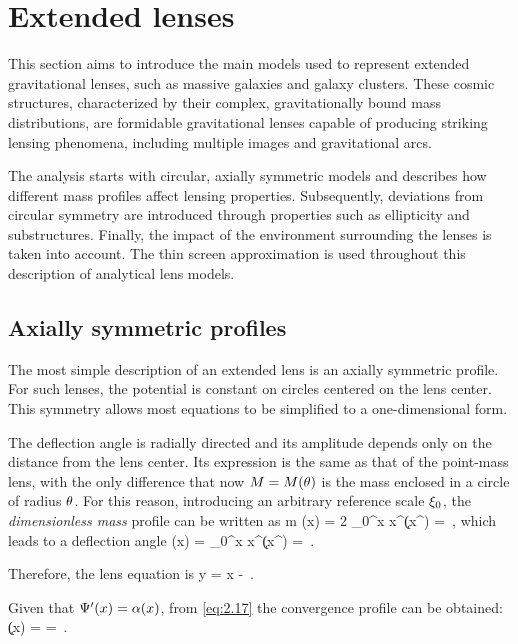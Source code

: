 \section{Extended lenses}
\label{sec:ext_lenses}
This section aims to introduce the main models used to represent extended gravitational lenses, such as massive galaxies and galaxy clusters. These cosmic structures, characterized by their complex, gravitationally bound mass distributions, are formidable gravitational lenses capable of producing striking lensing phenomena, including multiple images and gravitational arcs.

The analysis starts with circular, axially symmetric models and describes how different mass profiles affect lensing properties. Subsequently, deviations from circular symmetry are introduced through properties such as ellipticity and substructures. Finally, the impact of the environment surrounding the lenses is taken into account. The thin screen approximation is used throughout this description of analytical lens models.


\subsection{Axially symmetric profiles}
\label{subsec:axially_profiles}
The most simple description of an extended lens is an axially symmetric profile. For such lenses, the potential is constant on circles centered on the lens center. This symmetry allows most equations to be simplified to a one-dimensional form.

The deflection angle is radially directed and its amplitude depends only on the distance from the lens center. Its expression is the same as that of the point-mass lens, with the only difference that now $M = M(\theta)$ is the mass enclosed in a circle of radius $\theta$. For this reason, introducing an arbitrary reference scale $\xi_0$, the \emph{dimensionless mass} profile can be written as
\be
\label{eq:3.18}
m (x) = 2 \int_0^x x^\prime \k (x^\prime)  =  \,, 
\ee
which leads to a deflection angle
\be
\label{eq:3.19}
\a (x) =  \int_0^x x^\prime \k (x^\prime)  =  \,.
\ee

Therefore, the lens equation is
\be
\label{eq:3.20}
y = x -  \,.
\ee

Given that $\Psi^\prime (x) = \alpha (x)$, from \cref{eq:2.17} the convergence profile can be obtained:
\be
\label{eq:3.21}
\k (x) =   =  \,.
\ee


